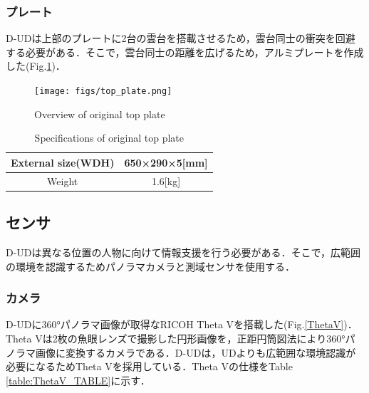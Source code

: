 \documentclass[12pt]{sonota/aislab}
\begin{document}
\subsubsection{プレート}
D-UDは上部のプレートに2台の雲台を搭載させるため，雲台同士の衝突を回避する必要がある．そこで，雲台同士の距離を広げるため，アルミプレートを作成した(Fig.\ref{plate})．

\begin{figure}[t]
\begin{center}
\texttt{[image: figs/top\_plate.png]}
\caption{Overview of original top plate}
\label{plate}
\end{center}
\end{figure}

\begin{table}[t]
	\caption{Specifications of original top plate}
	\label{table:plate}
	\centering 
	\begin{tabular}[tbp]{|c|c|}
		\hline 
		External size(WDH) & 650×290×5[mm] \\\hline
		Weight & 1.6[kg] \\\hline
	\end{tabular}
\end{table}

\subsection{センサ}
D-UDは異なる位置の人物に向けて情報支援を行う必要がある．そこで，広範囲の環境を認識するためパノラマカメラと測域センサを使用する．

\subsubsection{カメラ}
D-UDに360°パノラマ画像が取得なRICOH Theta Vを搭載した(Fig.\ref{ThetaV})．Theta Vは2枚の魚眼レンズで撮影した円形画像を，正距円筒図法により360°パノラマ画像に変換するカメラである．D-UDは，UDよりも広範囲な環境認識が必要になるためTheta Vを採用している．Theta Vの仕様をTable \ref{table:ThetaV_TABLE}に示す．
\end{document}
